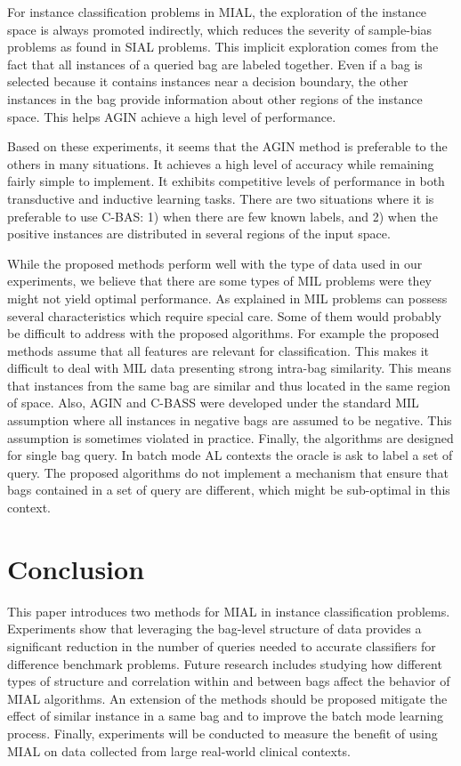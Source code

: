 \documentclass{article}
\begin{document}
For instance classification problems in MIAL, the exploration of the instance space is always promoted indirectly, which reduces the severity of sample-bias problems as found in SIAL problems. This implicit exploration comes from the fact that all instances of a queried bag are labeled together. Even if a bag is selected because it contains instances near a decision boundary, the other instances in the bag provide information about other regions of the instance space. This helps AGIN achieve a high level of performance.

Based on these experiments, it seems that the AGIN method is preferable to the others in many situations. It achieves a high level of accuracy while remaining fairly simple to implement. It exhibits competitive levels of performance in both transductive and inductive learning tasks. There are two situations where it is preferable to use C-BAS: 1) when there are few known labels, and 2) when the positive instances are distributed in several regions of the input space. 

While the proposed methods perform well with the type of data used in our experiments, we believe that there are some types of MIL problems were they might not yield optimal performance. As explained in \cite{Carbonneau2016Survey} MIL problems can possess several characteristics which require special care. Some of them would probably be difficult to address with the proposed algorithms. For example the proposed methods assume that all features are relevant for classification. This makes it difficult to deal with MIL data presenting strong intra-bag similarity. This means that instances from the same bag are similar and thus located in the same region of space.  Also, AGIN and C-BASS were developed under the standard MIL assumption where all instances in negative bags are assumed to be negative. This assumption is sometimes violated in practice. Finally, the algorithms are designed for single bag query. In batch mode AL contexts the oracle is ask to label a set of query. The proposed algorithms do not implement a mechanism that ensure that bags contained in a set of query are different, which might be sub-optimal in this context.  





\section{Conclusion}

This paper introduces two methods for MIAL in instance classification problems. Experiments show that leveraging the bag-level structure of data provides a significant reduction in the number of queries needed to accurate classifiers for difference benchmark problems. Future research includes studying how different types of structure and correlation within and between bags affect the behavior of MIAL algorithms. An extension of the methods should be proposed mitigate the effect of similar instance in a same bag and to improve the batch mode learning process. Finally, experiments will be conducted to measure the benefit of using MIAL on data collected from large real-world clinical contexts. 





\end{document}
